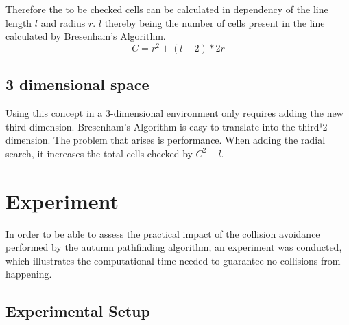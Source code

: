 Therefore the to be checked cells can be calculated in dependency of the line length $l$ and radius $r$. $l$ thereby being the number of cells present in the line calculated by Bresenham's Algorithm. 
\[C=r^2+(l-2)*2r\]

\subsection{3 dimensional space}
Using this concept in a 3-dimensional environment only requires adding the new third dimension. Bresenham's Algorithm is easy to translate into the third¹2 dimension. The problem that arises is performance. When adding the radial search, it increases the total cells checked by \(C^2 - l\).  

\section{Experiment}

In order to be able to assess the practical impact of the collision avoidance performed by the autumn pathfinding algorithm, an experiment was conducted, which illustrates the computational time needed to guarantee no collisions from happening.

\subsection{Experimental Setup}

